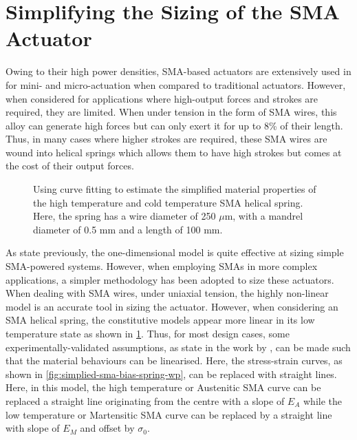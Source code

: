 \section{Simplifying the Sizing of the SMA Actuator}\label{sec:simplified-sma-model}
Owing to their high power densities, SMA-based actuators are extensively used in for mini- and micro-actuation when compared to traditional actuators. However, when considered for applications where high-output forces and strokes are required, they are limited. When under tension in the form of SMA wires, this alloy can generate high forces but can only exert it for up to 8\% of their length. Thus, in many cases where higher strokes are required, these SMA wires are wound into helical springs which allows them to have high strokes but comes at the cost of their output forces.

\begin{figure}[hbt]
    \centering
    \resizebox{0.75\textwidth}{!}{}
    \caption{Using curve fitting to estimate the simplified material properties of the high temperature and cold temperature SMA helical spring. Here, the spring has a wire diameter of 250 $\mu$m, with a mandrel diameter of 0.5 mm and a length of 100 mm.}
    \label{fig:sma-coil-curve-fit}
\end{figure}

As state previously, the one-dimensional model is quite effective at sizing simple SMA-powered systems. However, when employing SMAs in more complex applications, a simpler methodology has been adopted to size these actuators. When dealing with SMA wires, under uniaxial tension, the highly non-linear \cite{brinsonOneDimensionalConstitutiveBehavior1993} model is an accurate tool in sizing the actuator. However, when considering an SMA helical spring, the constitutive models appear more linear in its low temperature state as shown in \cref{fig:sma-coil-curve-fit}. Thus, for most design cases, some experimentally-validated assumptions, as state in the work by \cite{dragoniDesignDevelopmentAdvanced2021}, can be made such that the material behaviours can be linearised. Here, the stress-strain curves, as shown in \cref{fig:simplied-sma-bias-spring-wp}, can be replaced with straight lines. Here, in this model, the high temperature or Austenitic SMA curve can be replaced a straight line originating from the centre with a slope of $E_A$ while the low temperature or Martensitic SMA curve can be replaced by a straight line with slope of $E_M$ and offset by $\sigma_0$.

